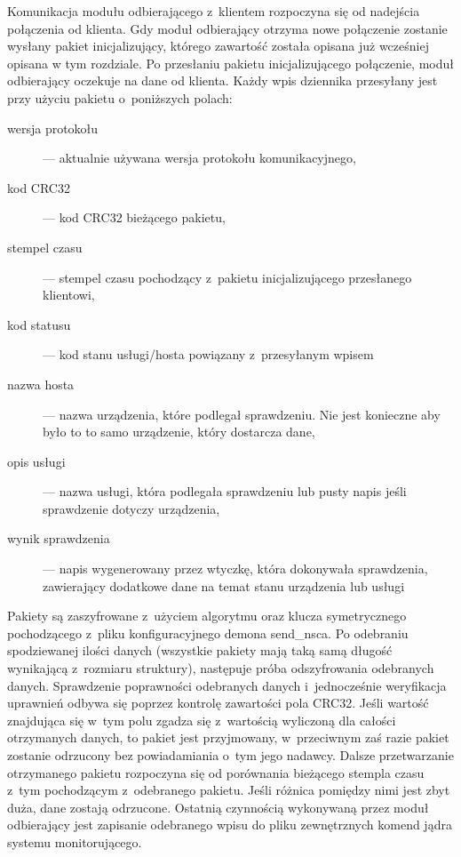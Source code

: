 Komunikacja modułu odbierającego z~klientem rozpoczyna się od
nadejścia połączenia od klienta. Gdy moduł odbierający otrzyma nowe
połączenie zostanie wysłany pakiet inicjalizujący, którego zawartość
została opisana już wcześniej opisana w tym rozdziale. Po przesłaniu
pakietu inicjalizującego połączenie, moduł odbierający oczekuje na
dane od klienta. Każdy wpis dziennika przesyłany jest przy użyciu
pakietu o~poniższych polach:

\begin{description}
\item[wersja protokołu] ---  aktualnie używana wersja protokołu komunikacyjnego,
\item[kod CRC32] ---  kod CRC32 bieżącego pakietu,
\item[stempel czasu] --- stempel czasu pochodzący z~pakietu
  inicjalizującego przesłanego klientowi,
\item[kod statusu] --- kod stanu usługi/hosta powiązany z~przesyłanym wpisem
\item[nazwa hosta] --- nazwa urządzenia, które podlegał sprawdzeniu. Nie jest
  konieczne aby było to to samo urządzenie, który dostarcza dane,
\item[opis usługi] --- nazwa usługi, która podlegała sprawdzeniu lub pusty
  napis jeśli sprawdzenie dotyczy urządzenia,
\item[wynik sprawdzenia] --- napis wygenerowany przez wtyczkę, która
  dokonywała sprawdzenia, zawierający dodatkowe dane na temat stanu
  urządzenia lub usługi
\end{description}

Pakiety są zaszyfrowane z~użyciem algorytmu oraz klucza symetrycznego
pochodzącego z~pliku konfiguracyjnego demona send\_nsca. Po odebraniu
spodziewanej ilości danych (wszystkie pakiety mają taką samą długość
wynikającą z~rozmiaru struktury), następuje próba odszyfrowania
odebranych danych. Sprawdzenie poprawności odebranych danych
i~jednocześnie weryfikacja uprawnień odbywa się poprzez kontrolę
zawartości pola CRC32. Jeśli wartość znajdująca się w~tym polu zgadza
się z~wartością wyliczoną dla całości otrzymanych danych, to pakiet
jest przyjmowany, w~przeciwnym zaś razie pakiet zostanie odrzucony bez
powiadamiania o~tym jego nadawcy. Dalsze przetwarzanie otrzymanego
pakietu rozpoczyna się od porównania bieżącego stempla czasu z~tym
pochodzącym z~odebranego pakietu. Jeśli różnica pomiędzy nimi jest
zbyt duża, dane zostają odrzucone. Ostatnią czynnością wykonywaną
przez moduł odbierający jest zapisanie odebranego wpisu do pliku
zewnętrznych komend jądra systemu monitorującego.

